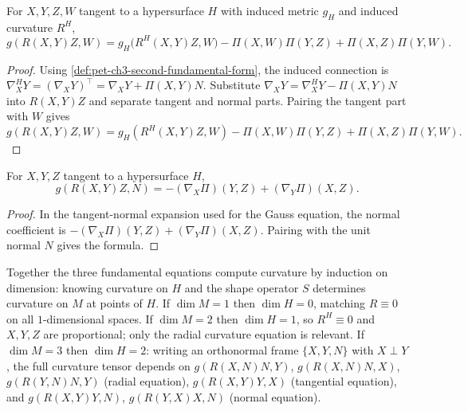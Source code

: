 \begin{theorem}
  \label{thm:pet-ch3-tangential-curvature-equation}


  For $X,Y,Z,W$ tangent to a hypersurface $H$ with induced metric $g_H$ and
  induced curvature $R^H$,
  \[
    g(R(X,Y)Z,W)=g_H\big(R^H(X,Y)Z,W\big)-\Pi(X,W)\Pi(Y,Z)+\Pi(X,Z)\Pi(Y,W).
  \]
\end{theorem}
\begin{proof}
  \sketch
  Using \cref{def:pet-ch3-second-fundamental-form}, the induced connection is
  $\nabla^H_XY=(\nabla_XY)^\top=\nabla_XY+\Pi(X,Y)N$. Substitute
  $\nabla_XY=\nabla^H_XY-\Pi(X,Y)N$ into $R(X,Y)Z$ and separate tangent and normal
  parts. Pairing the tangent part with $W$ gives
  \[
   g(R(X,Y)Z,W)=g_H(R^H(X,Y)Z,W)
   -\Pi(X,W)\Pi(Y,Z)+\Pi(X,Z)\Pi(Y,W).
  \]
\end{proof}

\begin{theorem}
  \label{thm:pet-ch3-normal-curvature-equation}


  For $X,Y,Z$ tangent to a hypersurface $H$,
  \[
    g(R(X,Y)Z,N)=-(\nabla_X\Pi)(Y,Z)+(\nabla_Y\Pi)(X,Z).
  \]
\end{theorem}
\begin{proof}
  \sketch
  In the tangent-normal expansion used for the Gauss equation, the normal
  coefficient is
  $-(\nabla_X\Pi)(Y,Z)+(\nabla_Y\Pi)(X,Z)$. Pairing with the unit normal $N$
  gives the formula.
\end{proof}

\begin{remark}
  \label{rem:pet-ch3-curvature-equations-by-dimension}


  Together the three fundamental equations compute curvature by induction on
  dimension: knowing curvature on $H$ and the shape operator $S$ determines
  curvature on $M$ at points of $H$. If $\dim M=1$ then $\dim H=0$, matching
  $R\equiv0$ on all $1$-dimensional spaces. If $\dim M=2$ then $\dim H=1$, so
  $R^H\equiv0$ and $X,Y,Z$ are proportional; only the radial curvature equation
  is relevant. If $\dim M=3$ then $\dim H=2$: writing an orthonormal frame
  $\{X,Y,N\}$ with $X\perp Y$, the full curvature tensor depends on
  $g(R(X,N)N,Y)$, $g(R(X,N)N,X)$, $g(R(Y,N)N,Y)$ (radial equation),
  $g(R(X,Y)Y,X)$ (tangential equation), and $g(R(X,Y)Y,N)$, $g(R(Y,X)X,N)$
  (normal equation).
\end{remark}

